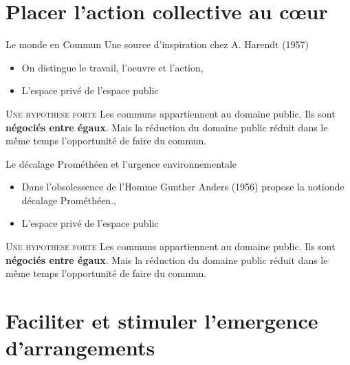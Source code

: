 \documentclass[newPxFont]{beamer}
\begin{document}
\section{Placer l'action collective au cœur}

\begin{frame}[c]{Le monde en Commun}
  \vspace{-1cm}
  Une source d'inspiration chez A. Harendt (1957)
  \begin{itemize}
    \item On distingue le travail, l'oeuvre et l'action, 
    \item L'espace privé de l'espace public
  \end{itemize}
  
  \small{
    \begin{alertblock}{\textsc{Une hypothese forte}}
      Les communs appartiennent au domaine public. Ils sont \textbf{négociés entre égaux}. Mais la réduction du domaine public réduit dans le même temps l’opportunité de faire du commun.
    \end{alertblock}
  }

  \end{frame}

  \begin{frame}[c]{Le décalage Prométhéen et l'urgence environnementale}
    \vspace{-1cm}
    
    \begin{itemize}
      \item Dans l'obsolessence de l'Homme Gunther Anders (1956) propose la notionde décalage Prométhéen., 
      \item L'espace privé de l'espace public
    \end{itemize}
    
    \small{
      \begin{alertblock}{\textsc{Une hypothese forte}}
        Les communs appartiennent au domaine public. Ils sont \textbf{négociés entre égaux}. Mais la réduction du domaine public réduit dans le même temps l’opportunité de faire du commun.
      \end{alertblock}
    }
  
    \end{frame}


\section{Faciliter et stimuler l'emergence d'arrangements}
\end{document}
